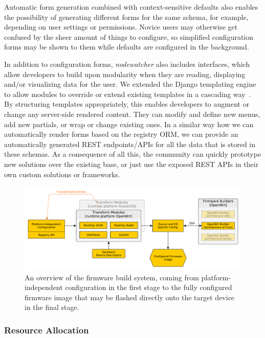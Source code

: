 \documentclass[5p,sort&compress]{elsarticle}
\newcommand{\nodewatcher}{\textit{nodewatcher}}
\begin{document}
Automatic form generation combined with context-sensitive defaults also enables the possibility of generating different forms for the same schema, for example, depending on user settings or permissions.
Novice users may otherwise get confused by the sheer amount of things to configure, so simplified configuration forms may be shown to them while defaults are configured in the background.

In addition to configuration forms, \nodewatcher{} also includes interfaces, which allow developers to build upon modularity when they are reading, displaying and/or visualizing data for the user.
We extended the Django templating engine to allow modules to override or extend existing templates in a cascading way~\cite{Overextend_2013}.
By structuring templates appropriately, this enables developers to augment or change any server-side rendered content.
They can modify and define new menus, add new partials, or wrap or change existing ones.
In a similar way how we can automatically render forms based on the registry ORM, we can provide an automatically generated REST endpoints/APIs for all the data that is stored in these schemas.
As a consequence of all this, the community can quickly prototype new solutions over the existing base, or just use the exposed REST APIs in their own custom solutions or frameworks.

\begin{figure}
  \centering
  \includegraphics[scale=0.5]{figures/firmware-buildsystem.pdf}
  \caption{An overview of the firmware build system, coming from platform-independent configuration in the first stage to the fully configured firmware image that may be flashed directly onto the target device in the final stage.}
  \label{fig:firmware-build-system}
\end{figure}

\subsubsection{Resource Allocation}
\label{sec:resource-allocation}
\end{document}
